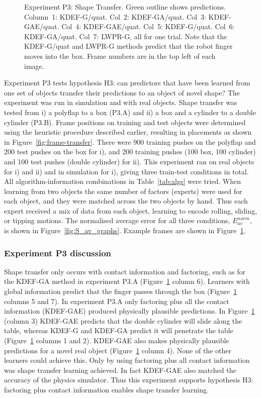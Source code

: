 \begin{figure}[t]
\caption {Experiment P3: Shape Transfer. Green outline shows predictions. Column~1: KDEF-G/quat. Col~2: KDEF-GA/quat. Col~3:
  KDEF-GAE/quat. Col~4: KDEF-GAE/quat. Col~5: KDEF-G/quat.
  Col~6: KDEF-GA/quat. Col~7: LWPR-G, all for one trial.  Note that the
  KDEF-G/quat and LWPR-G methods predict that the robot finger moves
  into the box.   Frame numbers are in
  the top left of each image.  }
\label{fig:ExperimentStransfer}
\end{figure}


Experiment P3 tests hypothesis H3: can predictors that have been learned from one set of objects transfer their predictions to an object of novel shape? The experiment was run in simulation and with real objects. Shape transfer was tested from i) a polyflap to a box (P3.A) and ii) a box and a cylinder to a double cylinder (P3.B). Frame positions on training and test objects were determined using the heuristic procedure described earlier, resulting in placements as shown in Figure~\ref{fig:frame-transfer}. There were 900 training pushes on the polyflap and 200 test pushes on the box for i), and 200 training pushes (100 box, 100 cylinder) and 100 test pushes (double cylinder) for ii). This experiment ran on real objects for i) and ii) and in simulation for i), giving three train-test conditions in total. All algorithm-information combinations in Table~\ref{tab:algs} were tried. When learning from two objects the same number of factors (experts) were used for each object, and they were matched across the two objects by hand. Thus each expert received a mix of data from each object, learning to encode rolling, sliding, or tipping motions.  The normalised average error for all three conditions, $E_{av}^{norm}$, is shown in Figure~\ref{fig:S_av_graphs}. Example frames are shown in Figure~\ref{fig:ExperimentStransfer}.

\subsubsection{Experiment P3 discussion} Shape transfer only occurs with contact information and factoring, such as for the
KDEF-GA method in experiment P3.A (Figure~\ref{fig:ExperimentStransfer} column 6).  Learners with global information predict that the finger passes through the box (Figure~\ref{fig:ExperimentStransfer} columns 5 and 7). In experiment P3.A only factoring plus all the contact information (KDEF-GAE) produced physically plausible predictions. In Figure~\ref{fig:ExperimentStransfer} (column 3) KDEF-GAE predicts that the double cylinder will slide along the table, whereas KDEF-G and KDEF-GA predict it will penetrate the table (Figure~\ref{fig:ExperimentStransfer} columns 1 and 2). KDEF-GAE also makes physically plausible predictions for a novel real object 
(Figure~\ref{fig:ExperimentStransfer} column 4). None of the other learners could achieve this. Only by using factoring plus all contact information was shape transfer learning achieved. In fact KDEF-GAE also matched the accuracy of the physics simulator. Thus this experiment supports hypothesis H3: factoring plus contact information enables shape transfer learning.


